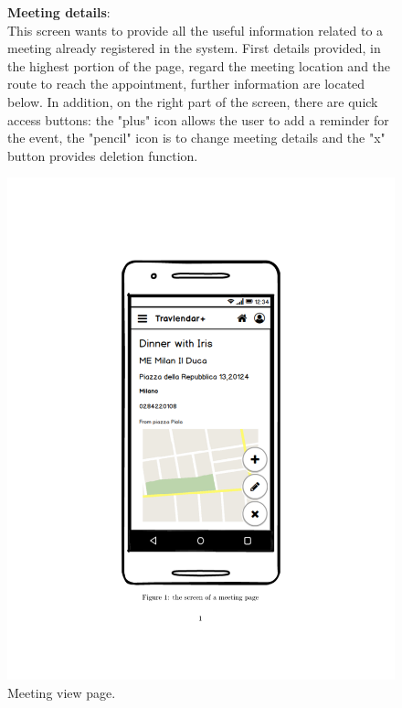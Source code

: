 	\begin{figure}
			\begin{flushleft}
			\textbf{Meeting details}:\\
			This screen wants to provide all the useful information related to a meeting already registered in the system. First details provided, in the highest portion of the page, regard the meeting location and the route to reach the appointment, further information are located below. In addition, on the right part of the screen, there are quick access buttons: the "plus" icon allows the user to add a reminder for the event, the "pencil" icon is to change meeting details and the "x" button provides deletion function. 
		\end{flushleft}
	\centering
	\includegraphics[width=0.6\linewidth]{mockups/MeetingView}
	\caption{Meeting view page. }
	\label{fig:meeting-view}
	\end{figure}
\clearpage

